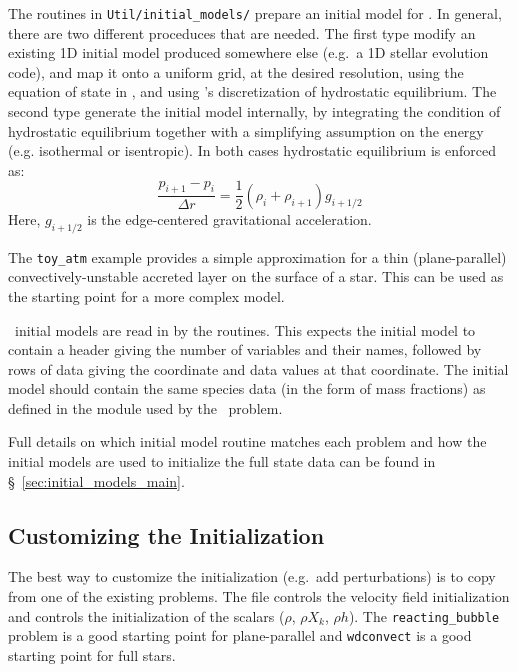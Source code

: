 The routines in {\tt Util/initial\_models/} prepare an initial model
for \maestro.  In general, there are two different proceduces that are
needed.  The first type modify an existing 1D initial model produced
somewhere else (e.g.\ a 1D stellar evolution code), and map it onto a
uniform grid, at the desired resolution, using the equation of state
in \maestro, and using \maestro's discretization of hydrostatic
equilibrium.  The second type generate the initial model internally,
by integrating the condition of hydrostatic equilibrium together with
a simplifying assumption on the energy (e.g. isothermal or
isentropic).  In both cases hydrostatic equilibrium is enforced as:
\begin{equation}
\frac{p_{i+1} - p_i}{\Delta r} = \frac{1}{2} (\rho_i + \rho_{i+1})
g_{i+1/2}
\end{equation}
Here, $g_{i+1/2}$ is the edge-centered gravitational acceleration.

The {\tt toy\_atm} example provides a simple approximation for a thin
(plane-parallel) convectively-unstable accreted layer on the surface
of a star.  This can be used as the starting point for a more complex
model.  

\maestro\ initial models are read in by the 
routines.  This expects the initial model to contain a header giving
the number of variables and their names, followed by rows of data
giving the coordinate and data values at that coordinate.  The initial
model should contain the same species data (in the form of mass fractions) as
defined in the  module used by the \maestro\ problem.

Full details on which initial model routine matches each problem and
how the initial models are used to initialize the full state data can
be found in \S~\ref{sec:initial_models_main}.

\subsection{Customizing the Initialization}

The best way to customize the initialization (e.g.\ add perturbations)
is to copy from one of the existing problems.  The file  controls the velocity field initialization and  controls the initialization of the scalars
($\rho$, $\rho X_k$, $\rho h$).  The {\tt reacting\_bubble} problem is a good
starting point for plane-parallel and {\tt wdconvect} is a good
starting point for full stars.



